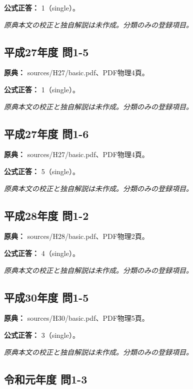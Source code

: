 \textbf{公式正答：} 1（single）。

\par\textit{原典本文の校正と独自解説は未作成。分類のみの登録項目。}

\subsection{平成27年度 問1-5}
\label{q:h27-reg-basic-1-5}

\noindent\textbf{原典：} sources/H27/basic.pdf、PDF物理4頁。

\textbf{公式正答：} 1（single）。

\par\textit{原典本文の校正と独自解説は未作成。分類のみの登録項目。}

\subsection{平成27年度 問1-6}
\label{q:h27-reg-basic-1-6}

\noindent\textbf{原典：} sources/H27/basic.pdf、PDF物理4頁。

\textbf{公式正答：} 5（single）。

\par\textit{原典本文の校正と独自解説は未作成。分類のみの登録項目。}

\subsection{平成28年度 問1-2}
\label{q:h28-reg-basic-1-2}

\noindent\textbf{原典：} sources/H28/basic.pdf、PDF物理2頁。

\textbf{公式正答：} 4（single）。

\par\textit{原典本文の校正と独自解説は未作成。分類のみの登録項目。}

\subsection{平成30年度 問1-5}
\label{q:h30-reg-basic-1-5}

\noindent\textbf{原典：} sources/H30/basic.pdf、PDF物理5頁。

\textbf{公式正答：} 3（single）。

\par\textit{原典本文の校正と独自解説は未作成。分類のみの登録項目。}

\subsection{令和元年度 問1-3}
\label{q:r01-reg-basic-1-3}

